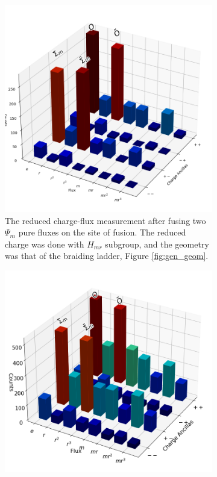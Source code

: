 \documentclass[two column]{article}
\begin{document}
\begin{figure}
\centering

\begin{subfigure}{0.47\textwidth}
    \includegraphics[width = \linewidth]{Figures/fusion_glasses.png}
    \caption{The reduced charge-flux measurement after fusing two $\Psi_m$ pure fluxes on the site of fusion. The reduced charge was done with $H_{mr}$ subgroup, and the geometry was that of the braiding ladder, Figure \ref{fig:gen_geom}.}
    \label{fig:fusion_glass}
\end{subfigure}\hfill
\begin{subfigure}{0.47\textwidth}
    \includegraphics[width=\linewidth]{Figures/fusion_on_basketball.png}

\end{subfigure}
\end{figure}
\end{document}
